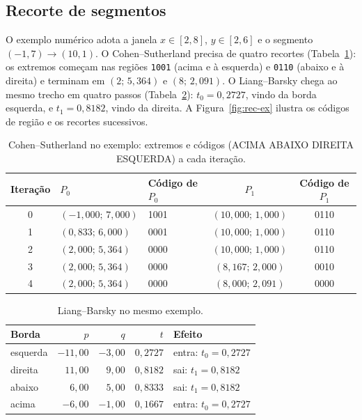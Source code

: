 \documentclass[11pt, a4paper]{article}
\begin{document}
\subsection{Recorte de segmentos}
O exemplo numérico adota a janela $x\in[2,8]$, $y\in[2,6]$ e o segmento $(-1,7)\to(10,1)$. O Cohen--Sutherland precisa de quatro recortes (Tabela~\ref{tab:cs}): os extremos começam nas regiões \texttt{1001} (acima e à esquerda) e \texttt{0110} (abaixo e à direita) e terminam em $(2;\,5{,}364)$ e $(8;\,2{,}091)$. O Liang--Barsky chega ao mesmo trecho em quatro passos (Tabela~\ref{tab:lb}): $t_0=0{,}2727$, vindo da borda esquerda, e $t_1=0{,}8182$, vindo da direita. A Figura~\ref{fig:rec-ex} ilustra os códigos de região e os recortes sucessivos.

\begin{table}[htbp]
  \centering
  \small
  \caption{Cohen--Sutherland no exemplo: extremos e códigos (ACIMA ABAIXO DIREITA ESQUERDA) a cada iteração.}
  \label{tab:cs}
  \begin{tabular}{cllcc}
    \toprule
    \textbf{Iteração} & \textbf{$P_0$} & \textbf{Código de $P_0$} & \textbf{$P_1$} & \textbf{Código de $P_1$} \\
    \midrule
    0 & $(-1{,}000;\,7{,}000)$ & 1001 & $(10{,}000;\,1{,}000)$ & 0110 \\
    1 & $(0{,}833;\,6{,}000)$ & 0001 & $(10{,}000;\,1{,}000)$ & 0110 \\
    2 & $(2{,}000;\,5{,}364)$ & 0000 & $(10{,}000;\,1{,}000)$ & 0110 \\
    3 & $(2{,}000;\,5{,}364)$ & 0000 & $(8{,}167;\,2{,}000)$ & 0010 \\
    4 & $(2{,}000;\,5{,}364)$ & 0000 & $(8{,}000;\,2{,}091)$ & 0000 \\
    \bottomrule
  \end{tabular}
\end{table}

\begin{table}[htbp]
  \centering
  \small
  \caption{Liang--Barsky no mesmo exemplo.}
  \label{tab:lb}
  \begin{tabular}{lrrrl}
    \toprule
    \textbf{Borda} & $p$ & $q$ & $t$ & \textbf{Efeito} \\
    \midrule
    esquerda & $-11{,}00$ & $-3{,}00$ & $0{,}2727$ & entra: $t_0=0{,}2727$ \\
    direita & $11{,}00$ & $9{,}00$ & $0{,}8182$ & sai: $t_1=0{,}8182$ \\
    abaixo & $6{,}00$ & $5{,}00$ & $0{,}8333$ & sai: $t_1=0{,}8182$ \\
    acima & $-6{,}00$ & $-1{,}00$ & $0{,}1667$ & entra: $t_0=0{,}2727$ \\
    \bottomrule
  \end{tabular}
\end{table}
\end{document}
